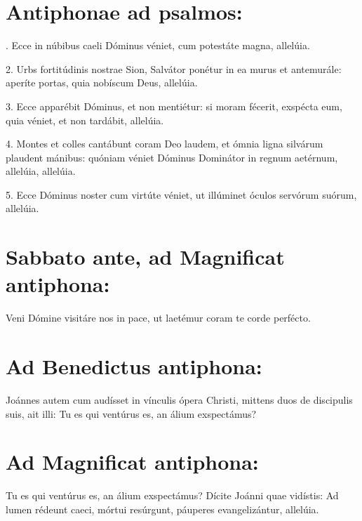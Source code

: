 \documentclass[a4paper, twoside, 12pt]{article}
\begin{document}
\section{Antiphonae ad psalmos:}

. Ecce in núbibus caeli Dóminus véniet,
cum potestáte magna, allelúia.

2. Urbs fortitúdinis nostrae Sion,
Salvátor ponétur in ea murus et antemurále:
aperíte portas,
quia nobíscum Deus, allelúia.

3. Ecce apparébit Dóminus,
et non mentiétur:
si moram fécerit, exspécta eum, 
quia véniet, et non tardábit, allelúia.

4. Montes et colles cantábunt coram Deo laudem,
et ómnia ligna silvárum plaudent mánibus:
quóniam véniet Dóminus Dominátor in regnum aetérnum, allelúia, allelúia.

5. Ecce Dóminus noster cum virtúte véniet,
ut illúminet óculos servórum suórum, allelúia.

\section{Sabbato ante, ad Magnificat antiphona:}

Veni Dómine visitáre nos in pace,
ut laetémur coram te corde perfécto.

\section{Ad Benedictus antiphona:}

Joánnes autem cum audísset in vínculis ópera Christi,
mittens duos de discipulis suis, ait illi:
Tu es qui ventúrus es, an álium exspectámus?

\section{Ad Magnificat antiphona:}

Tu es qui ventúrus es, an álium exspectámus?
Dícite Joánni quae vidístis:
Ad lumen rédeunt caeci,
mórtui resúrgunt, 
páuperes evangelizántur, allelúia.
\end{document}
